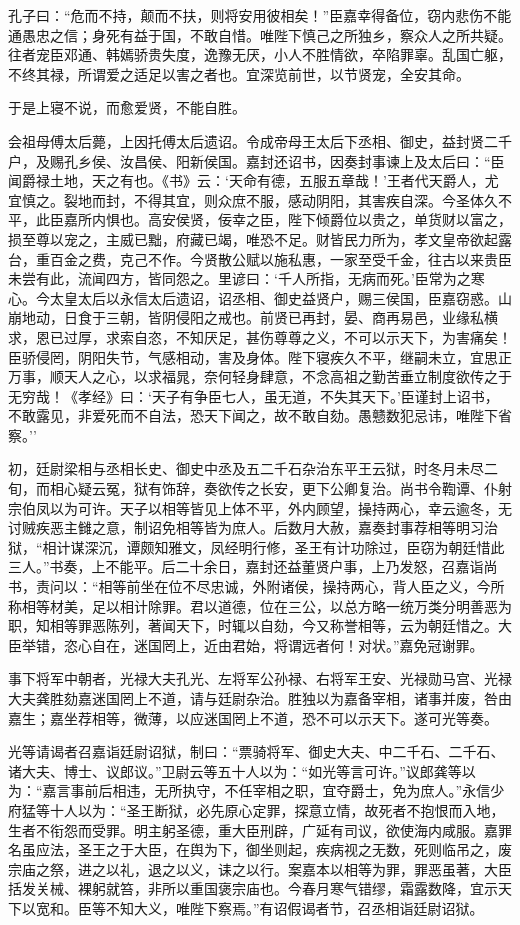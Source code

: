 \documentclass[]{article}
\begin{document}
孔子曰：``危而不持，颠而不扶，则将安用彼相矣！''臣嘉幸得备位，窃内悲伤不能通愚忠之信；身死有益于国，不敢自惜。唯陛下慎己之所独乡，察众人之所共疑。往者宠臣邓通、韩嫣骄贵失度，逸豫无厌，小人不胜情欲，卒陷罪辜。乱国亡躯，不终其禄，所谓爱之适足以害之者也。宜深览前世，以节贤宠，全安其命。

于是上寝不说，而愈爱贤，不能自胜。

会祖母傅太后薨，上因托傅太后遗诏。令成帝母王太后下丞相、御史，益封贤二千户，及赐孔乡侯、汝昌侯、阳新侯国。嘉封还诏书，因奏封事谏上及太后曰：``臣闻爵禄土地，天之有也。《书》云：`天命有德，五服五章哉！'王者代天爵人，尤宜慎之。裂地而封，不得其宜，则众庶不服，感动阴阳，其害疾自深。今圣体久不平，此臣嘉所内惧也。高安侯贤，佞幸之臣，陛下倾爵位以贵之，单货财以富之，损至尊以宠之，主威已黜，府藏已竭，唯恐不足。财皆民力所为，孝文皇帝欲起露台，重百金之费，克己不作。今贤散公赋以施私惠，一家至受千金，往古以来贵臣未尝有此，流闻四方，皆同怨之。里谚曰：`千人所指，无病而死。'臣常为之寒心。今太皇太后以永信太后遗诏，诏丞相、御史益贤户，赐三侯国，臣嘉窃惑。山崩地动，日食于三朝，皆阴侵阳之戒也。前贤已再封，晏、商再易邑，业缘私横求，恩已过厚，求索自恣，不知厌足，甚伤尊尊之义，不可以示天下，为害痛矣！臣骄侵罔，阴阳失节，气感相动，害及身体。陛下寝疾久不平，继嗣未立，宜思正万事，顺天人之心，以求福晁，奈何轻身肆意，不念高祖之勤苦垂立制度欲传之于无穷哉！《孝经》曰：`天子有争臣七人，虽无道，不失其天下。'臣谨封上诏书，不敢露见，非爱死而不自法，恐天下闻之，故不敢自劾。愚戆数犯忌讳，唯陛下省察。''

初，廷尉梁相与丞相长史、御史中丞及五二千石杂治东平王云狱，时冬月未尽二旬，而相心疑云冤，狱有饰辞，奏欲传之长安，更下公卿复治。尚书令鞫谭、仆射宗伯凤以为可许。天子以相等皆见上体不平，外内顾望，操持两心，幸云逾冬，无讨贼疾恶主雠之意，制诏免相等皆为庶人。后数月大赦，嘉奏封事荐相等明习治狱，``相计谋深沉，谭颇知雅文，凤经明行修，圣王有计功除过，臣窃为朝廷惜此三人。''书奏，上不能平。后二十余日，嘉封还益董贤户事，上乃发怒，召嘉诣尚书，责问以：``相等前坐在位不尽忠诚，外附诸侯，操持两心，背人臣之义，今所称相等材美，足以相计除罪。君以道德，位在三公，以总方略一统万类分明善恶为职，知相等罪恶陈列，著闻天下，时辄以自劾，今又称誉相等，云为朝廷惜之。大臣举错，恣心自在，迷国罔上，近由君始，将谓远者何！对状。''嘉免冠谢罪。

事下将军中朝者，光禄大夫孔光、左将军公孙禄、右将军王安、光禄勋马宫、光禄大夫龚胜劾嘉迷国罔上不道，请与廷尉杂治。胜独以为嘉备宰相，诸事并废，咎由嘉生；嘉坐荐相等，微薄，以应迷国罔上不道，恐不可以示天下。遂可光等奏。

光等请谒者召嘉诣廷尉诏狱，制曰：``票骑将军、御史大夫、中二千石、二千石、诸大夫、博士、议郎议。''卫尉云等五十人以为：``如光等言可许。''议郎龚等以为：``嘉言事前后相违，无所执守，不任宰相之职，宜夺爵士，免为庶人。''永信少府猛等十人以为：``圣王断狱，必先原心定罪，探意立情，故死者不抱恨而入地，生者不衔怨而受罪。明主躬圣德，重大臣刑辟，广延有司议，欲使海内咸服。嘉罪名虽应法，圣王之于大臣，在舆为下，御坐则起，疾病视之无数，死则临吊之，废宗庙之祭，进之以礼，退之以义，诔之以行。案嘉本以相等为罪，罪恶虽著，大臣括发关械、裸躬就笞，非所以重国褒宗庙也。今春月寒气错缪，霜露数降，宜示天下以宽和。臣等不知大义，唯陛下察焉。''有诏假谒者节，召丞相诣廷尉诏狱。
\end{document}
